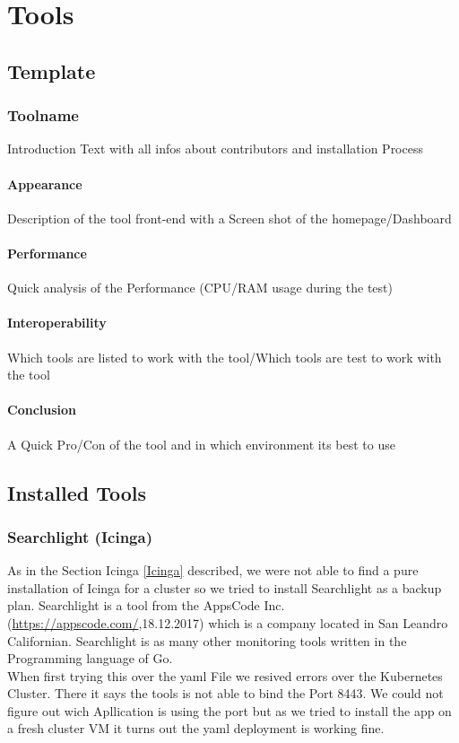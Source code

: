  
\chapter{Tools} %
\section{Template}
\subsection{Toolname}
\label{Toolname} %
Introduction Text with all infos about contributors and installation Process
\subsubsection{Appearance}%
Description of the tool front-end with a Screen shot of the homepage/Dashboard
\subsubsection{Performance}
Quick analysis of the Performance (CPU/RAM usage during the test)
\subsubsection{Interoperability}
Which tools are listed to work with the tool/Which tools are test to work with the tool
\subsubsection{Conclusion}
A Quick Pro/Con of the tool and in which environment its best to use
\section{Installed Tools}%
\subsection{Searchlight (Icinga)}
\label{searchlight}
As in the Section Icinga \ref{Icinga} described, we were not able to find a pure installation of Icinga for a cluster so we tried to install Searchlight as a backup plan.
Searchlight is a tool from the AppsCode Inc. (\url{https://appscode.com/},18.12.2017) which is a company located in San Leandro Californian. 
Searchlight is as many other monitoring tools written in the Programming language of Go.
\\
When first trying this over the yaml File we resived errors over the Kubernetes Cluster. There it says the tools is not able to bind the Port 8443. We could not figure out wich Apllication is using the port but as we tried to install the app on a fresh cluster VM it turns out the yaml deployment is working fine.
